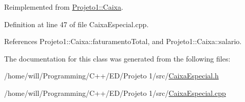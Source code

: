 Reimplemented from \hyperlink{classProjeto1_1_1Caixa_a70c900f948864a28e2661dab17b10f9f}{Projeto1::Caixa}.



Definition at line 47 of file CaixaEspecial.cpp.



References Projeto1::Caixa::faturamentoTotal, and Projeto1::Caixa::salario.



The documentation for this class was generated from the following files:\begin{DoxyCompactItemize}
\item 
/home/will/Programming/C++/ED/Projeto 1/src/\hyperlink{CaixaEspecial_8h}{CaixaEspecial.h}\item 
/home/will/Programming/C++/ED/Projeto 1/src/\hyperlink{CaixaEspecial_8cpp}{CaixaEspecial.cpp}\end{DoxyCompactItemize}
